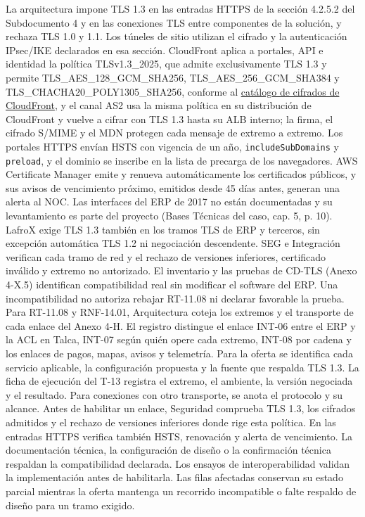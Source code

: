 La arquitectura impone TLS 1.3 en las entradas HTTPS de la sección 4.2.5.2 del Subdocumento 4 y en las conexiones TLS entre componentes de la solución, y rechaza TLS 1.0 y 1.1. Los túneles de sitio utilizan el cifrado y la autenticación IPsec/IKE declarados en esa sección. CloudFront aplica a portales, API e identidad la política TLSv1.3\_2025, que admite exclusivamente TLS 1.3 y permite TLS\_AES\_128\_GCM\_SHA256, TLS\_AES\_256\_GCM\_SHA384 y TLS\_CHACHA20\_POLY1305\_SHA256, conforme al \href{https://docs.aws.amazon.com/AmazonCloudFront/latest/DeveloperGuide/secure-connections-supported-viewer-protocols-ciphers.html}{catálogo de cifrados de CloudFront}, y el canal AS2 usa la misma política en su distribución de CloudFront y vuelve a cifrar con TLS 1.3 hasta su ALB interno; la firma, el cifrado S/MIME y el MDN protegen cada mensaje de extremo a extremo. Los portales HTTPS envían HSTS con vigencia de un año, \texttt{includeSubDomains} y \texttt{preload}, y el dominio se inscribe en la lista de precarga de los navegadores. AWS Certificate Manager emite y renueva automáticamente los certificados públicos, y sus avisos de vencimiento próximo, emitidos desde 45 días antes, generan una alerta al NOC. Las interfaces del ERP de 2017 no están documentadas y su levantamiento es parte del proyecto (Bases Técnicas del caso, cap. 5, p. 10). LafroX exige TLS 1.3 también en los tramos TLS de ERP y terceros, sin excepción automática TLS 1.2 ni negociación descendente. SEG e Integración verifican cada tramo de red y el rechazo de versiones inferiores, certificado inválido y extremo no autorizado. El inventario y las pruebas de CD-TLS (Anexo 4-X.5) identifican compatibilidad real sin modificar el software del ERP. Una incompatibilidad no autoriza rebajar RT-11.08 ni declarar favorable la prueba. Para RT-11.08 y RNF-14.01, Arquitectura coteja los extremos y el transporte de cada enlace del Anexo 4-H. El registro distingue el enlace INT-06 entre el ERP y la ACL en Talca, INT-07 según quién opere cada extremo, INT-08 por cadena y los enlaces de pagos, mapas, avisos y telemetría. Para la oferta se identifica cada servicio aplicable, la configuración propuesta y la fuente que respalda TLS 1.3. La ficha de ejecución del T-13 registra el extremo, el ambiente, la versión negociada y el resultado. Para conexiones con otro transporte, se anota el protocolo y su alcance. Antes de habilitar un enlace, Seguridad comprueba TLS 1.3, los cifrados admitidos y el rechazo de versiones inferiores donde rige esta política. En las entradas HTTPS verifica también HSTS, renovación y alerta de vencimiento. La documentación técnica, la configuración de diseño o la confirmación técnica respaldan la compatibilidad declarada. Los ensayos de interoperabilidad validan la implementación antes de habilitarla. Las filas afectadas conservan su estado parcial mientras la oferta mantenga un recorrido incompatible o falte respaldo de diseño para un tramo exigido.


